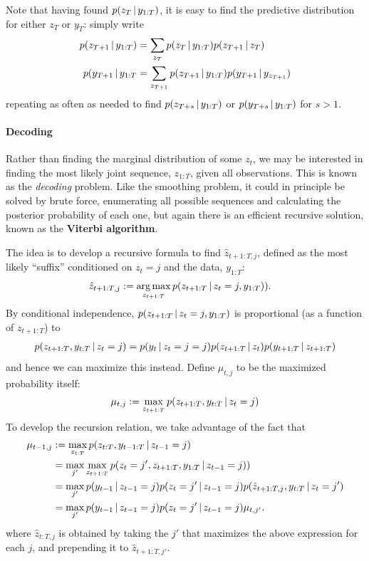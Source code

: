 Note that having found $p(z_T \, \vert \, y_{1:T})$, it is easy to find the
predictive distribution for either $z_T$ or $y_{T}$: simply write
\begin{align}
  p(z_{T+1} \, \vert \, y_{1:T}) &= \sum_{z_T} p(z_T \, \vert \, y_{1:T})
                              p(z_{T+1} \, \vert \, z_{T}) \\
  p(y_{T+1} \, \vert \, y_{1:T} &= \sum_{z_{T+1}} p(z_{T+1} \, \vert \, y_{1:T})
                             p(y_{T+1} \, \vert \, y_{z_{T+1}})
\end{align}
repeating as often as needed to find $p(z_{T+s} \, \vert \, y_{1:T})$ or
$p(y_{T+s} \, \vert \, y_{1:T})$ for $s > 1$.

\paragraph{Decoding}

Rather than finding the marginal distribution of some $z_t$, we may be
interested in finding the most likely joint sequence, $z_{1:T}$, given
all observations.  This is known as the {\em decoding} problem.  Like
the smoothing problem, it could in principle be solved by brute force,
enumerating all possible sequences and calculating the posterior
probability of each one, but again there is an efficient recursive
solution, known as the {\bf Viterbi algorithm}.

The idea is to develop
a recursive formula to find
  $\hat{z}_{t+1:T,j}$, defined as the most likely ``suffix''
  conditioned on $z_t = j$ and the data, $y_{1:T}$:
  \begin{align}
    \hat{z}_{t+1:T,j} &:= \operatorname*{arg\,max}_{z_{t+1:T}} p(z_{t+1:T} \, \vert \, z_t =
                        j, y_{1:T})).
  \end{align}
By conditional independence, $p(z_{t+1:T} \, \vert \, z_t =
                        j, y_{1:T})$ is proportional (as a function of
                        $z_{t+1:T}$) to
  \begin{align}
    p(z_{t+1:T}, y_{t:T} \, \vert \, z_t = j) =
    p(y_{t} \, \vert \, z_t = j
    = j) p(z_{t+1:T} \, \vert \, z_t) p(y_{t+1:T} \, \vert \, z_{t+1:T})
  \end{align}
  and hence we can maximize this instead.  Define $\mu_{t,j}$ to be the maximized probability itself:
  \begin{align}
    \mu_{t,j} := \max_{z_{t+1:T}} p(z_{t+1:T}, y_{t:T} \, \vert \, z_{t} = j)
  \end{align}
  To develop the recursion relation, we take advantage of the
  fact that
  \begin{align}
    \mu_{t-1,j} &:= \max_{z_{t:T}} p(z_{t:T}, y_{t-1:T} \, \vert \, z_{t-1} = j) \\
    &= \max_{j'} \max_{z_{t+1:T}} p(z_{t} = {j'},
      z_{t+1:T},  y_{1:T}
    \, \vert \, z_{t-1} = j)) \\
    &= \max_{j'} p(y_{t-1} \, \vert \, z_{t-1} = j) p(z_t = j' \, \vert \,
      z_{t-1} = j) p(\hat{z}_{t+1:T,j}, y_{t:T} \, \vert \, z_t = j') \\
    &= \max_{j'} p(y_{t-1} \, \vert \, z_{t-1} = j) p(z_t = j' \, \vert \,
      z_{t-1} = j) \mu_{t,j'}.
  \end{align}
  where $\hat{z}_{t:T,j}$ is obtained by taking the $j'$ that maximizes
  the above expression for each $j$, and prepending it to $\hat{z}_{t+1:T,j'}$.
  

